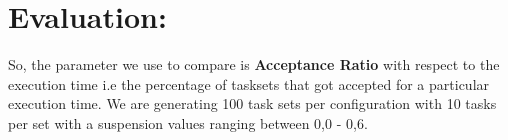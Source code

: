\documentclass[]{article}
\begin{document}
        \section{Evaluation:}

{
\raggedleft So, the parameter we use to compare is \textbf{Acceptance Ratio} with respect to the execution time i.e the percentage of tasksets that got accepted for a particular execution time. We are generating 100 task sets per configuration with 10 tasks per set with a suspension values ranging between 0,0 - 0,6. \newline
}
\end{document}
